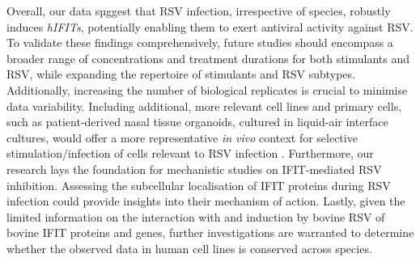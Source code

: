 Overall, our data sµggest that RSV infection, irrespective of species, robustly induces \textit{hIFITs}, potentially enabling them to exert antiviral activity against RSV. To validate these findings comprehensively, future studies should encompass a broader range of concentrations and treatment durations for both stimulants and RSV, while expanding the repertoire of stimulants and RSV subtypes. Additionally, increasing the number of biological replicates is crucial to minimise data variability. Including additional, more relevant cell lines and primary cells, such as patient-derived nasal tissue organoids, cultured in liquid-air interface cultures, would offer a more representative \textit{in vivo} context for selective stimulation/infection of cells relevant to RSV infection \cite{Michi2021ACells, Rajan2022TheTherapeutics}. Furthermore, our research lays the foundation for mechanistic studies on IFIT-mediated RSV inhibition. Assessing the subcellular localisation of IFIT proteins during RSV infection could provide insights into their mechanism of action. Lastly, given the limited information on the interaction with and induction by bovine RSV of bovine IFIT proteins and genes, further investigations are warranted to determine whether the observed data in human cell lines is conserved across species.






